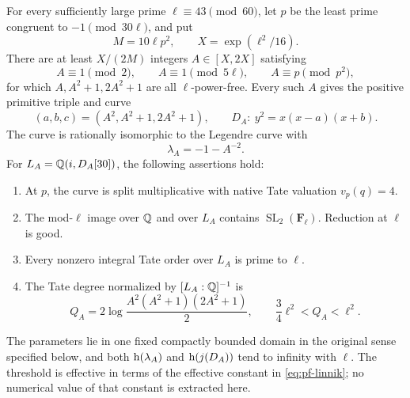 \begin{theorem}
\label{thm:powerfree-global-family}
For every sufficiently large prime \(\ell\equiv43\pmod {60}\), let \(p\)
be the least prime congruent to \(-1\pmod {30\ell}\), and put
\begin{equation}\label{eq:pf-parameters}
 M=10\ell p^2,\qquad X=\exp(\ell^2/16).
\end{equation}
There are at least \(X/(2M)\) integers \(A\in[X,2X]\) satisfying
\begin{equation}\label{eq:pf-crt}
 A\equiv1\pmod2,\qquad A\equiv1\pmod {5\ell},
 \qquad A\equiv p\pmod {p^2},
\end{equation}
for which \(A,A^2+1,2A^2+1\) are all \(\ell\)-power-free.
Every such \(A\) gives the positive primitive triple and curve
\begin{equation}\label{eq:pf-family}
 (a,b,c)=(A^2,A^2+1,2A^2+1),\qquad
 D_A:\ y^2=x(x-a)(x+b).
\end{equation}
The curve is rationally isomorphic to the Legendre curve with
\[
 \lambda_A=-1-A^{-2}.
\]
For \(L_A=\mathbb Q(i,D_A[30])\), the following assertions hold:
\begin{enumerate}
\item At \(p\), the curve is split multiplicative with native Tate
      valuation \(v_p(q)=4\).
\item The mod-\(\ell\) image over \(\mathbb Q\) and over \(L_A\) contains
      \(\operatorname{SL}_2(\mathbf F_\ell)\). Reduction at \(\ell\) is good.
\item Every nonzero integral Tate order over \(L_A\) is prime to \(\ell\).
\item The Tate degree normalized by \([L_A:\mathbb Q]^{-1}\) is
      \begin{equation}\label{eq:pf-degree}
       Q_A=2\log\frac{A^2(A^2+1)(2A^2+1)}2,
       \qquad \frac34\ell^2<Q_A<\ell^2.
      \end{equation}
\end{enumerate}
The parameters lie in one fixed compactly bounded domain in the original
sense specified below, and both \(\mathrm h(\lambda_A)\) and
\(\mathrm h(j(D_A))\) tend to infinity with \(\ell\). The threshold is
effective in terms of the effective constant in \eqref{eq:pf-linnik};
no numerical value of that constant is extracted here.
\end{theorem}

